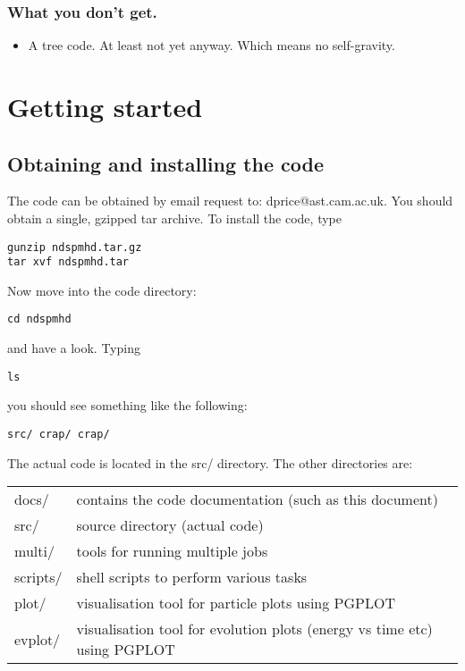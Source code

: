 \documentclass[a4paper,12pt]{article}
\begin{document}
\subsubsection{What you don't get.}
\begin{itemize}
\item A tree code. At least not yet anyway. Which means no self-gravity.
\end{itemize}

\section{Getting started}

\subsection{Obtaining and installing the code}
The code can be obtained by email request to: dprice@ast.cam.ac.uk. You
should obtain a single, gzipped tar archive. To install the code, type
\begin{verbatim}
gunzip ndspmhd.tar.gz
tar xvf ndspmhd.tar
\end{verbatim}
Now move into the code directory:
\begin{verbatim}
cd ndspmhd
\end{verbatim}
and have a look. Typing
\begin{verbatim}
ls
\end{verbatim}
 you should see something like the following:
\begin{verbatim}
src/ crap/ crap/
\end{verbatim}
The actual code is located in the src/ directory. The other
directories are:
\begin{table}[!h]
\begin{tabular}{ll}
\hline
docs/ & contains the code documentation (such as this document) \\
src/ & source directory (actual code)\\
multi/ & tools for running multiple jobs\\
scripts/ & shell scripts to perform various tasks\\
plot/ & visualisation tool for particle plots using PGPLOT \\
evplot/ & visualisation tool for evolution plots (energy vs time etc) using
PGPLOT \\
\hline
\end{tabular}
\end{table}
\end{document}
